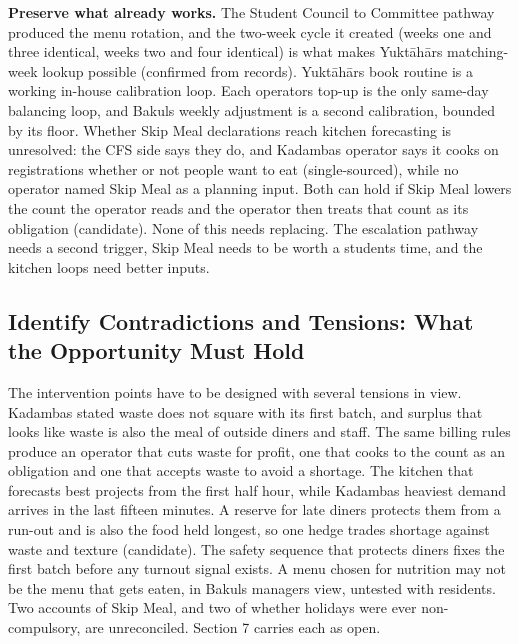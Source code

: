 \documentclass[
  10pt,
  table]{article}
\begin{document}
\textbf{Preserve what already works.} The Student Council to Committee pathway produced the menu rotation, and the two-week cycle it created (weeks one and three identical, weeks two and four identical) is what makes Yuktāhār\textquotesingle s matching-week lookup possible (confirmed from records). Yuktāhār\textquotesingle s book routine is a working in-house calibration loop. Each operator\textquotesingle s top-up is the only same-day balancing loop, and Bakul\textquotesingle s weekly adjustment is a second calibration, bounded by its floor. Whether Skip Meal declarations reach kitchen forecasting is unresolved: the CFS side says they do, and Kadamba\textquotesingle s operator says it cooks on registrations whether or not people want to eat (single-sourced), while no operator named Skip Meal as a planning input. Both can hold if Skip Meal lowers the count the operator reads and the operator then treats that count as its obligation (candidate). None of this needs replacing. The escalation pathway needs a second trigger, Skip Meal needs to be worth a student\textquotesingle s time, and the kitchen loops need better inputs.

\subsection{Identify Contradictions and Tensions: What the Opportunity Must Hold}\label{identify-contradictions-and-tensions-what-the-opportunity-must-hold}

The intervention points have to be designed with several tensions in view. Kadamba\textquotesingle s stated waste does not square with its first batch, and surplus that looks like waste is also the meal of outside diners and staff. The same billing rules produce an operator that cuts waste for profit, one that cooks to the count as an obligation and one that accepts waste to avoid a shortage. The kitchen that forecasts best projects from the first half hour, while Kadamba\textquotesingle s heaviest demand arrives in the last fifteen minutes. A reserve for late diners protects them from a run-out and is also the food held longest, so one hedge trades shortage against waste and texture (candidate). The safety sequence that protects diners fixes the first batch before any turnout signal exists. A menu chosen for nutrition may not be the menu that gets eaten, in Bakul\textquotesingle s manager\textquotesingle s view, untested with residents. Two accounts of Skip Meal, and two of whether holidays were ever non-compulsory, are unreconciled. Section 7 carries each as open.
\end{document}
